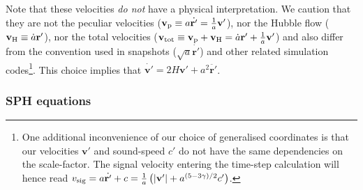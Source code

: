 Note that these velocities \emph{do not} have a physical
interpretation. We caution that they are not the peculiar velocities
($\mathbf{v}_{\rm p} \equiv a\dot{\mathbf{r}'} =
\frac{1}{a}\mathbf{v}'$), nor the Hubble flow
($\mathbf{v}_{\rm H} \equiv \dot{a}\mathbf{r}'$), nor the total
velocities
($\mathbf{v}_{\rm tot} \equiv \mathbf{v}_{\rm p} + \mathbf{v}_{\rm H}
= \dot{a}\mathbf{r}' + \frac{1}{a}\mathbf{v}'$) and also differ from
the convention used in \gadget snapshots
($\sqrt{a} \dot{\mathbf{r}'}$) and other related simulation
codes\footnote{One additional inconvenience of our choice of
  generalised coordinates is that our velocities $\mathbf{v}'$ and
  sound-speed $c'$ do not have the same dependencies on the
  scale-factor. The signal velocity entering the time-step calculation
  will hence read
  $v_{\rm sig} = a\dot{\mathbf{r}'} + c = \frac{1}{a} \left(
    |\mathbf{v}'| + a^{(5 - 3\gamma)/2}c'\right)$.}.
This choice implies that $\dot{\mathbf{v}'} = 2H\mathbf{v}' +  a^2\ddot{\mathbf{r}'}$.

\subsubsection{SPH equations}

